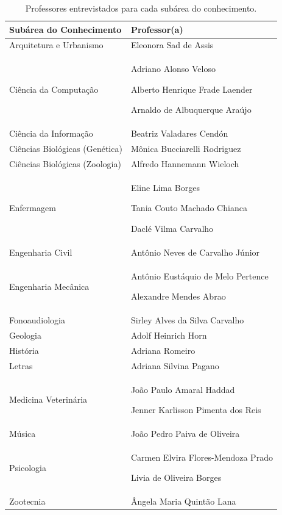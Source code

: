 \begin{table}
    \caption{Professores entrevistados para cada subárea do conhecimento.}
    \begin{center}
        \begin{tabular}{|p{6cm}|p{8cm}|}
            \hline 
            \textbf{Subárea do Conhecimento} & \textbf{Professor(a)}\\ 
            \hline 
            Arquitetura e Urbanismo & Eleonora Sad de Assis \\
            \hline
            Ciência da Computação & Adriano Alonso Veloso \par 
                                    Alberto Henrique Frade Laender \par 
                                    Arnaldo de Albuquerque Araújo \\
            \hline
            Ciência da Informação & Beatriz Valadares Cendón \\
            \hline
            Ciências Biológicas (Genética) & Mônica Bucciarelli Rodriguez \\
            \hline
            Ciências Biológicas (Zoologia) & Alfredo Hannemann Wieloch \\
            \hline
            Enfermagem & Eline Lima Borges \par
                         Tania Couto Machado Chianca \par
                         Daclé Vilma Carvalho \\
            \hline
            Engenharia Civil & Antônio Neves de Carvalho Júnior \\
            \hline
            Engenharia Mecânica & Antônio Eustáquio de Melo Pertence \par
                                  Alexandre Mendes Abrao \\
            \hline
            Fonoaudiologia & Sirley Alves da Silva Carvalho \\
            \hline
            Geologia & Adolf Heinrich Horn \\
            \hline
            História & Adriana Romeiro \\
            \hline
            Letras & Adriana Silvina Pagano \\
            \hline
            Medicina Veterinária & João Paulo Amaral Haddad \par
                                   Jenner Karlisson Pimenta dos Reis \\
            \hline
            Música & João Pedro Paiva de Oliveira \\
            \hline
            Psicologia & Carmen Elvira Flores-Mendoza Prado \par
                         Livia de Oliveira Borges \\
            \hline
            Zootecnia & Ângela Maria Quintão Lana \\
            \hline
        \end{tabular}
    \end{center}
    \label{tab:subareas-professores}
\end{table}

